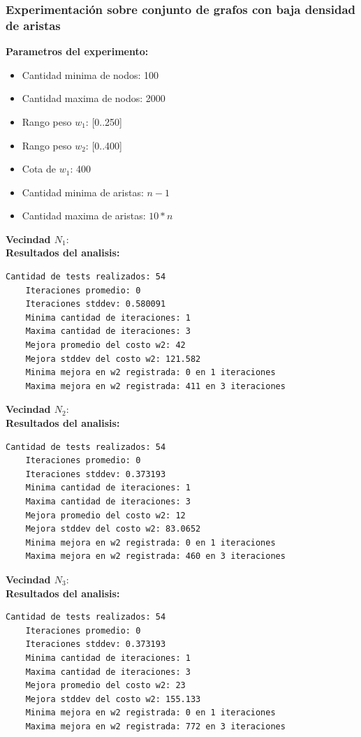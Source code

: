 \subsubsection{Experimentaci\'on sobre conjunto de grafos con baja densidad de aristas}

\textbf{Parametros del experimento:}
\begin{itemize}
	\item Cantidad minima de nodos: 100
	\item Cantidad maxima de nodos: 2000
	\item Rango peso $w_1$: [0..250]
	\item Rango peso $w_2$: [0..400]
	\item Cota de $w_1$: 400
	\item Cantidad minima de aristas: $n-1$
	\item Cantidad maxima de aristas: $10*n$
\end{itemize}  

\textbf{Vecindad $N_1$}:\\
\textbf{Resultados del analisis:}
\begin{lstlisting}[frame=single]
	Cantidad de tests realizados: 54
	Iteraciones promedio: 0
	Iteraciones stddev: 0.580091
	Minima cantidad de iteraciones: 1
	Maxima cantidad de iteraciones: 3
	Mejora promedio del costo w2: 42
	Mejora stddev del costo w2: 121.582
	Minima mejora en w2 registrada: 0 en 1 iteraciones
	Maxima mejora en w2 registrada: 411 en 3 iteraciones
\end{lstlisting}

\textbf{Vecindad $N_2$}:\\
\textbf{Resultados del analisis:}
\begin{lstlisting}[frame=single]
	Cantidad de tests realizados: 54
	Iteraciones promedio: 0
	Iteraciones stddev: 0.373193
	Minima cantidad de iteraciones: 1
	Maxima cantidad de iteraciones: 3
	Mejora promedio del costo w2: 12
	Mejora stddev del costo w2: 83.0652
	Minima mejora en w2 registrada: 0 en 1 iteraciones
	Maxima mejora en w2 registrada: 460 en 3 iteraciones
\end{lstlisting}

\textbf{Vecindad $N_3$}:\\
\textbf{Resultados del analisis:}
\begin{lstlisting}[frame=single]
	Cantidad de tests realizados: 54
	Iteraciones promedio: 0
	Iteraciones stddev: 0.373193
	Minima cantidad de iteraciones: 1
	Maxima cantidad de iteraciones: 3
	Mejora promedio del costo w2: 23
	Mejora stddev del costo w2: 155.133
	Minima mejora en w2 registrada: 0 en 1 iteraciones
	Maxima mejora en w2 registrada: 772 en 3 iteraciones
\end{lstlisting}

